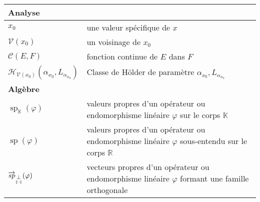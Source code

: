 \begin{tabularx}{\textwidth}{lX}
	\midrule
	\textbf{Analyse}                                                 &                                                                                                                                                                                                            \\
	\midrule
	$x_0$                                                            & une valeur spécifique de $x$                                                                                                                                                                               \\
	$\mathcal{V}(x_0)$                                               & un voisinage de $x_0$                                                                                                                                                                                      \\
	$\mathcal C(E, F)$                                               & fonction continue de $E$ dans $F$                                                                                                                                                                          \\
	$\mathcal{H}_{\mathcal{V}(x_0)}(\alpha_{x_0}, L_{\alpha_{x_0}})$ & Classe de Hölder de paramètre $\alpha_{x_0}, L_{\alpha_{x_0}}$                                                                                                                                             \\
	\midrule
	\textbf{Algèbre}                                                 &                                                                                                                                                                                                            \\
	\midrule
	$\operatorname{sp}_{\mathds K}(\varphi)$                         & valeurs propres d'un opérateur ou endomorphisme linéaire $\varphi$ sur le corps $\mathds K$                                                                                                                \\
	$\operatorname{sp}(\varphi)$                                     & valeurs propres d'un opérateur ou endomorphisme linéaire $\varphi$ sous-entendu sur le corps $\mathds R$                                                                                                   \\
	$\overrightarrow{sp}_{\underset{\Vert \cdot \Vert}{\perp}}(\varphi)$                    & vecteurs propres d'un opérateur ou endomorphisme linéaire $\varphi$ formant une famille orthogonale                                                                                                        \\

\end{tabularx}
